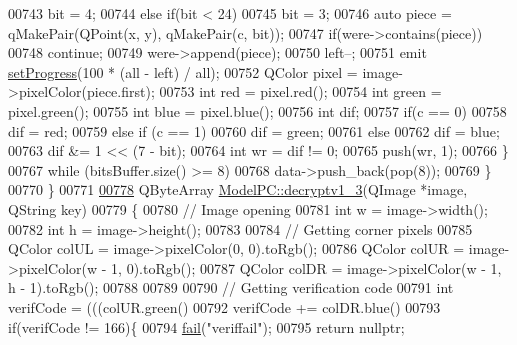 \begin{DoxyCode}
00743                 bit = 4;
00744             \textcolor{keywordflow}{else} \textcolor{keywordflow}{if}(bit < 24)
00745                 bit = 3;
00746             \textcolor{keyword}{auto} piece = qMakePair(QPoint(x, y), qMakePair(c, bit));
00747             \textcolor{keywordflow}{if}(were->contains(piece))
00748                 \textcolor{keywordflow}{continue};
00749             were->append(piece);
00750             left--;
00751             emit \hyperlink{class_model_p_c_afdcd80f0ed5062e145a71f09b0897547}{setProgress}(100 * (all - left) / all);
00752             QColor pixel = image->pixelColor(piece.first);
00753             \textcolor{keywordtype}{int} red = pixel.red();
00754             \textcolor{keywordtype}{int} green = pixel.green();
00755             \textcolor{keywordtype}{int} blue = pixel.blue();
00756             \textcolor{keywordtype}{int} dif;
00757             \textcolor{keywordflow}{if}(c == 0)
00758                 dif = red;
00759             \textcolor{keywordflow}{else} \textcolor{keywordflow}{if} (c == 1)
00760                 dif = green;
00761             \textcolor{keywordflow}{else}
00762                 dif = blue;
00763             dif &= 1 << (7 - bit);
00764             \textcolor{keywordtype}{int} wr = dif != 0;
00765             push(wr, 1);
00766         \}
00767         \textcolor{keywordflow}{while} (bitsBuffer.size() >= 8)
00768             data->push\_back(pop(8));
00769     \}
00770 \}
00771 
\hypertarget{modelpc_8cpp_source.tex_l00778}{}\hyperlink{class_model_p_c_a4fe70ebbedfaf31d45a35f82d0f06caa}{00778} QByteArray \hyperlink{class_model_p_c_a4fe70ebbedfaf31d45a35f82d0f06caa}{ModelPC::decryptv1\_3}(QImage *image, QString key)
00779 \{
00780     \textcolor{comment}{// Image opening}
00781     \textcolor{keywordtype}{int} w = image->width();
00782     \textcolor{keywordtype}{int} h = image->height();
00783 
00784     \textcolor{comment}{// Getting corner pixels}
00785     QColor colUL = image->pixelColor(0, 0).toRgb();
00786     QColor colUR = image->pixelColor(w - 1, 0).toRgb();
00787     QColor colDR = image->pixelColor(w - 1, h - 1).toRgb();
00788 
00789 
00790     \textcolor{comment}{// Getting verification code}
00791     \textcolor{keywordtype}{int} verifCode = (((colUR.green() %
00792     verifCode += colDR.blue() %
00793     \textcolor{keywordflow}{if}(verifCode != 166)\{
00794         \hyperlink{class_model_p_c_a47464b59b7e37fcee25e55475708aabd}{fail}(\textcolor{stringliteral}{"veriffail"});
00795         \textcolor{keywordflow}{return} \textcolor{keyword}{nullptr};

\end{DoxyCode}
